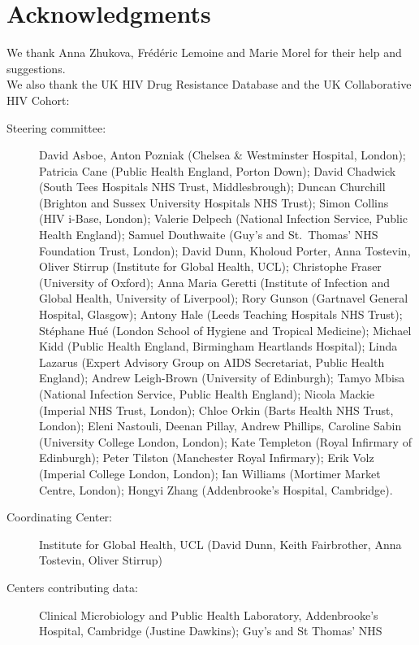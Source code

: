 \documentclass[
  11,
]{scrbook}
\begin{document}
\hypertarget{acknowledgments}{%
\section*{Acknowledgments}\label{acknowledgments}}

We thank Anna Zhukova, Frédéric Lemoine and Marie Morel for their help
and suggestions.\\
We also thank the UK HIV Drug Resistance Database and the UK
Collaborative HIV Cohort:\\

\begin{description}
\item[Steering committee:]
David Asboe, Anton Pozniak (Chelsea \& Westminster Hospital, London);
Patricia Cane (Public Health England, Porton Down); David Chadwick
(South Tees Hospitals NHS Trust, Middlesbrough); Duncan Churchill
(Brighton and Sussex University Hospitals NHS Trust); Simon Collins
(HIV i-Base, London); Valerie Delpech (National Infection Service,
Public Health England); Samuel Douthwaite (Guy's and St.~Thomas' NHS
Foundation Trust, London); David Dunn, Kholoud Porter, Anna
Tostevin, Oliver Stirrup (Institute for Global Health, UCL);
Christophe Fraser (University of Oxford); Anna Maria Geretti
(Institute of Infection and Global Health, University of Liverpool);
Rory Gunson (Gartnavel General Hospital, Glasgow); Antony Hale
(Leeds Teaching Hospitals NHS Trust); Stéphane Hué (London School of
Hygiene and Tropical Medicine); Michael Kidd (Public Health England,
Birmingham Heartlands Hospital); Linda Lazarus (Expert Advisory
Group on AIDS Secretariat, Public Health England); Andrew
Leigh-Brown (University of Edinburgh); Tamyo Mbisa (National
Infection Service, Public Health England); Nicola Mackie (Imperial
NHS Trust, London); Chloe Orkin (Barts Health NHS Trust, London);
Eleni Nastouli, Deenan Pillay, Andrew Phillips, Caroline Sabin
(University College London, London); Kate Templeton (Royal Infirmary
of Edinburgh); Peter Tilston (Manchester Royal Infirmary); Erik Volz
(Imperial College London, London); Ian Williams (Mortimer Market
Centre, London); Hongyi Zhang (Addenbrooke's Hospital, Cambridge).
\item[Coordinating Center:]
Institute for Global Health, UCL (David Dunn, Keith Fairbrother,
Anna Tostevin, Oliver Stirrup)
\item[Centers contributing data:]
Clinical Microbiology and Public Health Laboratory, Addenbrooke's
Hospital, Cambridge (Justine Dawkins); Guy's and St Thomas' NHS

\end{description}
\end{document}
